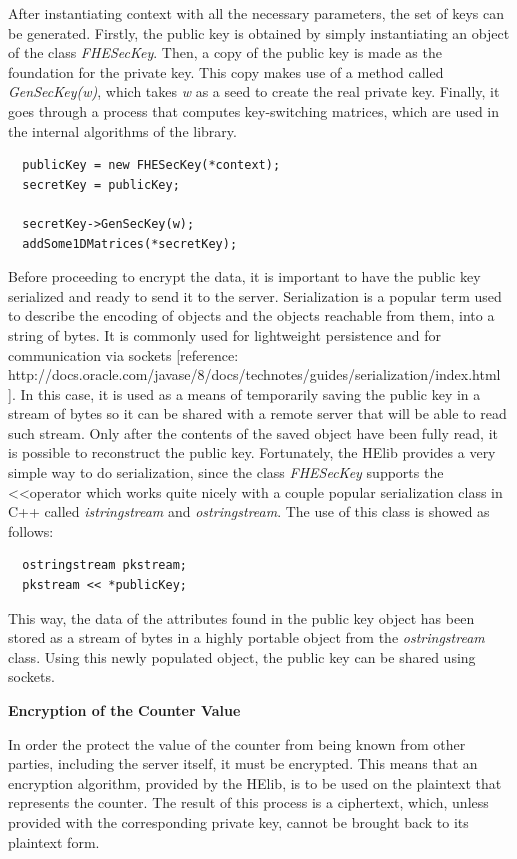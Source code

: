 After instantiating context with all the necessary parameters, the set of keys can be generated. Firstly, the public key is obtained by simply instantiating an object of the class \textit{FHESecKey}. Then, a copy of the public key is made as the foundation for the private key. This copy makes use of a method called \textit{GenSecKey(w)}, which takes \textit{w} as a seed to create the real private key. Finally, it goes through a process that computes key-switching matrices, which are used in the internal algorithms of the library.

\begin{lstlisting}
  publicKey = new FHESecKey(*context);
  secretKey = publicKey;

  secretKey->GenSecKey(w); 
  addSome1DMatrices(*secretKey); 
\end{lstlisting}

Before proceeding to encrypt the data, it is important to have the public key serialized and ready to send it to the server. Serialization is a popular term used to describe the encoding of objects and the objects reachable from them, into a string of bytes. It is commonly used for lightweight persistence and for communication via sockets 
[reference: http://docs.oracle.com/javase/8/docs/technotes/guides/serialization/index.html ]. In this case, it is used as a means of temporarily saving the public key in a stream of bytes so it can be shared with a remote server that will be able to read such stream. Only after the contents of the saved object have been fully read, it is possible to reconstruct the public key. Fortunately, the HElib provides a very simple way to do serialization, since the class 
\textit{FHESecKey} supports the \textless\textless operator which works quite nicely with a couple popular serialization class in C++ called \textit{istringstream} and \textit{ostringstream}. The use of this class is showed as follows: 


\begin{lstlisting}
  ostringstream pkstream;
  pkstream << *publicKey;
\end{lstlisting}


This way, the data of the attributes found in the public key object has been stored as a stream of bytes in a highly portable object from the \textit{ostringstream} class. Using this newly populated object, the public key can be shared using sockets.

\textbf{Encryption of the Counter Value}

In order the protect the value of the counter from being known from other parties, including the server itself, it must be encrypted. This means that an encryption algorithm, provided by the HElib, is to be used on the plaintext that represents the counter. The result of this process is a ciphertext, which, unless provided with the corresponding private key, cannot be brought back to its plaintext form. 

